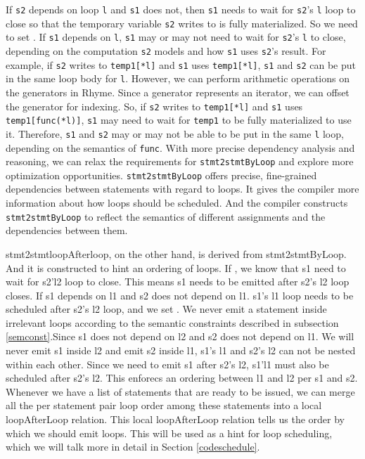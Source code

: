 \documentclass[sigplan, nonacm]{acmart}\settopmatter{printfolios=true,printccs=false,printacmref=false}
\begin{document}
If \texttt{s2} depends on loop \texttt{l} and \texttt{s1} does not, then \texttt{s1} needs to wait for \texttt{s2}'s \texttt{l} loop to close so that the temporary variable \texttt{s2} writes to is fully materialized. So we need to set . If \texttt{s1} depends on \texttt{l}, \texttt{s1} may or may not need to wait for \texttt{s2}'s \texttt{l} to close, depending on the computation \texttt{s2} models and how \texttt{s1} uses \texttt{s2}'s result. For example, if \texttt{s2} writes to \texttt{temp1[*l]} and \texttt{s1} uses \texttt{temp1[*l]}, \texttt{s1} and \texttt{s2} can be put in the same loop body for \texttt{l}. However, we can perform arithmetic operations on the generators in Rhyme. Since a generator represents an iterator, we can offset the generator for indexing. So, if \texttt{s2} writes to \texttt{temp1[*l]} and \texttt{s1} uses \texttt{temp1[func(*l)]}, \texttt{s1} may need to wait for \texttt{temp1} to be fully materialized to use it. Therefore, \texttt{s1} and \texttt{s2} may or may not be able to be put in the same \texttt{l} loop, depending on the semantics of \texttt{func}. With more precise dependency analysis and reasoning, we can relax the requirements for \texttt{stmt2stmtByLoop} and explore more optimization opportunities. \texttt{stmt2stmtByLoop} offers precise, fine-grained dependencies between statements with regard to loops. It gives the compiler more information about how loops should be scheduled. And the compiler constructs \texttt{stmt2stmtByLoop} to reflect the semantics of different assignments and the dependencies between them.\par
\iffalse
stmt2stmtloopAfterloop, on the other hand, is derived from stmt2stmtByLoop. And it is constructed to hint an ordering of loops. If , we know that s1 need to wait for s2'l2 loop to close. This means s1 needs to be emitted after s2's l2 loop closes. If s1 depends on l1 and s2 does not depend on l1. s1's l1 loop needs to be scheduled after s2's l2 loop, and we set . We never emit a statement inside irrelevant loops according to the semantic constraints described in subsection \ref{semconst}.Since s1 does not depend on l2 and s2 does not depend on l1. We will never emit s1 inside l2 and emit s2 inside l1, s1's l1 and s2's l2 can not be nested within each other. Since we need to emit s1 after s2's l2, s1'l1 must also be scheduled after s2's l2. This enforecs an ordering between l1 and l2 per s1 and s2. Whenever we have a list of statements that are ready to be issued, we can merge all the per statement pair loop order among these statements into a local loopAfterLoop relation. This local loopAfterLoop relation tells us the order by which we should emit loops. This will be used as a hint for loop scheduling, which we will talk more in detail in Section \ref{codeschedule}.
\end{document}
